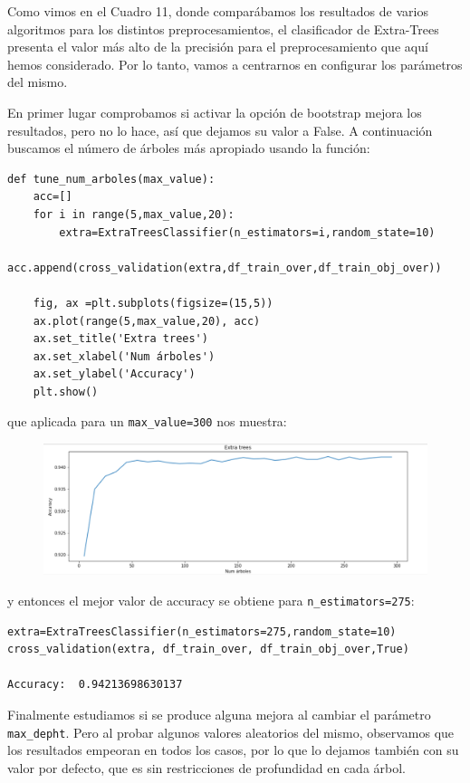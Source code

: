 \documentclass[a4paper,11pt]{article}
\begin{document}
Como vimos en el Cuadro 11, donde comparábamos los resultados de varios algoritmos para los distintos preprocesamientos, el clasificador de Extra-Trees presenta el valor más alto de la precisión para el preprocesamiento que aquí hemos considerado. Por lo tanto, vamos a centrarnos en configurar los parámetros del mismo.  

En primer lugar comprobamos si activar la opción de bootstrap mejora los resultados, pero no lo hace, así que dejamos su valor a False. A continuación buscamos el número de árboles más apropiado usando la función:
\begin{verbatim}
def tune_num_arboles(max_value):
	acc=[]
	for i in range(5,max_value,20):
		extra=ExtraTreesClassifier(n_estimators=i,random_state=10)
		acc.append(cross_validation(extra,df_train_over,df_train_obj_over))
	
	fig, ax =plt.subplots(figsize=(15,5))
	ax.plot(range(5,max_value,20), acc)
	ax.set_title('Extra trees')
	ax.set_xlabel('Num árboles')
	ax.set_ylabel('Accuracy')
	plt.show()
\end{verbatim} 

que aplicada para un \texttt{max_value=300} nos muestra:
\begin{figure}[H]
	\centering
	\includegraphics[width=0.9\linewidth]{img/extra3}
	\caption{}
	\label{fig:extra3}
\end{figure}

y entonces el mejor valor de accuracy se obtiene para \texttt{n_estimators=275}:

\begin{verbatim}
extra=ExtraTreesClassifier(n_estimators=275,random_state=10)
cross_validation(extra, df_train_over, df_train_obj_over,True)

Accuracy:  0.94213698630137
\end{verbatim}

Finalmente estudiamos si se produce alguna mejora al cambiar el parámetro \texttt{max_depht}. Pero al probar algunos valores aleatorios del mismo, observamos que los resultados empeoran en todos los casos, por lo que lo dejamos también con su valor por defecto, que  es sin restricciones de profundidad en cada árbol.
\end{document}
